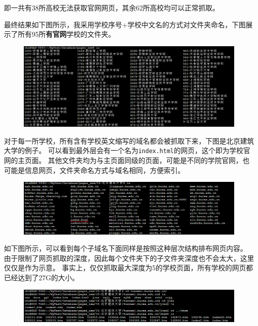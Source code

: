 \documentclass[logo,reportComp]{thesis}
\begin{document}
即一共有38所高校无法获取官网网页，其余62所高校均可以正常抓取。

最终结果如下图所示，我采用学校序号+学校中文名的方式对文件夹命名，下图展示了所有95所\textbf{有官网}学校的文件夹。
\begin{figure}[H]
\centering
\includegraphics[width=\linewidth]{fig/all_schools.png}
\end{figure}

对于每一所学校，所有含有学校英文缩写的域名都会被抓取下来，下图是北京建筑大学的例子。
可以看到最外层会有一个名为\verb'index.html'的网页，这个即为学校官网的主页面。
其他文件夹均为与主页面同级的页面，可能是不同的学院官网，也可能是信息网页，文件夹命名方式与域名相同，方便索引。
\begin{figure}[H]
\centering
\includegraphics[width=\linewidth]{fig/eg.png}
\end{figure}

如下图所示，可以看到每个子域名下面同样是按照这种层次结构排布网页内容。
由于限制了网页抓取的深度，因此每个文件夹下的子文件夹深度也不会太大，这里仅仅是作为示意。
事实上，仅仅抓取最大深度为5的学校页面，所有学校的网页都已经达到了27G的大小。
\begin{figure}[H]
\centering
\includegraphics[width=\linewidth]{fig/eg2.png}
\end{figure}
\end{document}
